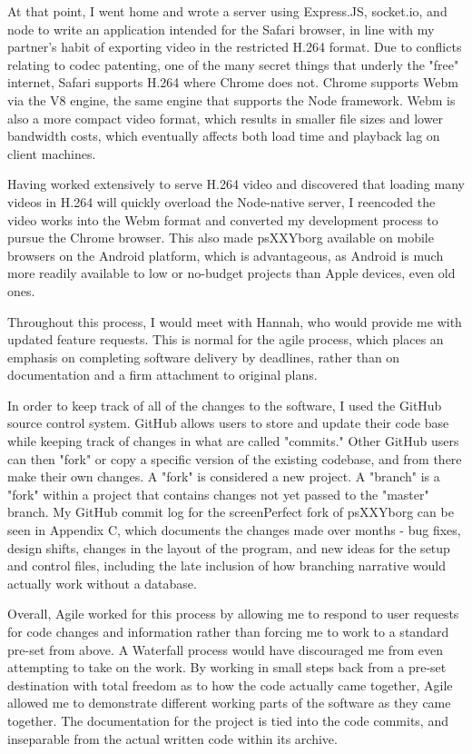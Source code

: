 At that point, I went home and wrote a server using Express.JS, socket.io, and node to write an application intended for the Safari browser, in line with my partner's habit of exporting video in the restricted H.264 format. Due to conflicts relating to codec patenting, one of the many secret things that underly the "free" internet, Safari supports H.264 where Chrome does not. Chrome supports Webm via the V8 engine, the same engine that supports the Node framework. Webm is also a more compact video format, which results in smaller file sizes and lower bandwidth costs, which eventually affects both load time and playback lag on client machines. 

Having worked extensively to serve H.264 video and discovered that loading many videos in H.264 will quickly overload the Node-native server, I reencoded the video works into the Webm format and converted my development process to pursue the Chrome browser. This also made psXXYborg available on mobile browsers on the Android platform, which is advantageous, as Android is much more readily available to low or no-budget projects than Apple devices, even old ones.

Throughout this process, I would meet with Hannah, who would provide me with updated feature requests. This is normal for the agile process, which places an emphasis on completing software delivery by deadlines, rather than on documentation and a firm attachment to original plans. 

In order to keep track of all of the changes to the software, I used the GitHub source control system. GitHub allows users to store and update their code base while keeping track of changes in what are called "commits." Other GitHub users can then "fork" or copy a specific version of the existing codebase, and from there make their own changes. A "fork" is considered a new project. A "branch" is a "fork" within a project that contains changes not yet passed to the "master" branch. My GitHub commit log for the screenPerfect fork of psXXYborg can be seen in Appendix C, which documents the changes made over months - bug fixes, design shifts, changes in the layout of the program, and new ideas for the setup and control files, including the late inclusion of how branching narrative would actually work without a database.

Overall, Agile worked for this process by allowing me to respond to user requests for code changes and information rather than forcing me to work to a standard pre-set from above. A Waterfall process would have discouraged me from even attempting to take on the work. By working in small steps back from a pre-set destination with total freedom as to how the code actually came together, Agile allowed me to demonstrate different working parts of the software as they came together. The documentation for the project is tied into the code commits, and inseparable from the actual written code within its archive.

